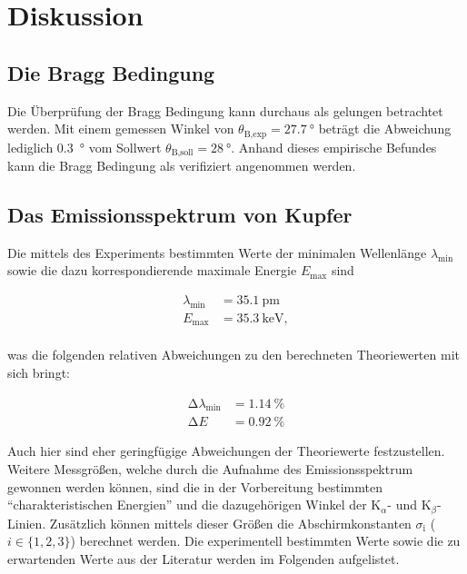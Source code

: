 %

%
\section{Diskussion}
\label{sec:Diskussion}

\subsection{Die Bragg Bedingung}

Die Überprüfung der Bragg Bedingung kann durchaus als gelungen betrachtet werden. Mit einem gemessen Winkel von $\theta_\text{B,exp} = \qty{27.7}{\degree}$
beträgt die Abweichung lediglich \qty{0.3}{\degree} vom Sollwert $\theta_\text{B,soll} = \qty{28}{\degree}$. Anhand dieses empirische Befundes kann 
die Bragg Bedingung als verifiziert angenommen werden. 

\subsection{Das Emissionsspektrum von Kupfer}

Die mittels des Experiments bestimmten Werte der minimalen Wellenlänge $\lambda_\text{min}$ sowie die dazu korrespondierende maximale Energie $E_\text{max}$
sind 

\begin{align*}
    \lambda_\text{min} &= \qty{35.1}{\pico\meter} \\
    E_\text{max} &= \qty{35.3}{\kilo\electronvolt}, \\
\end{align*}

\noindent was die folgenden relativen Abweichungen zu den berechneten Theoriewerten mit sich bringt:

\begin{align*}
    \increment\lambda_\text{min} &= \qty{1.14}{\percent}\\
    \increment{}E &= \qty{0.92}{\percent}
\end{align*}

\noindent Auch hier sind eher geringfügige Abweichungen der Theoriewerte festzustellen.\\

\noindent Weitere Messgrößen, welche durch die Aufnahme des Emissionsspektrum gewonnen werden können, sind die in der Vorbereitung bestimmten  
\enquote{charakteristischen Energien} und die dazugehörigen Winkel der $\text{K}_\alpha$- und $\text{K}_\beta$-Linien. Zusätzlich können mittels 
dieser Größen die Abschirmkonstanten $\sigma_\text{i}$ ($i \in \{1,2,3\}$) berechnet werden. Die experimentell bestimmten Werte sowie die zu erwartenden 
Werte aus der Literatur\cite{nist} werden im Folgenden aufgelistet. 

